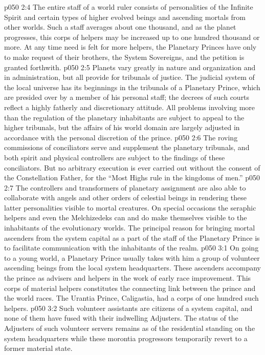 \vs p050 2:4 The entire staff of a world ruler consists of personalities of the Infinite Spirit and certain types of higher evolved beings and ascending mortals from other worlds. Such a staff averages about one thousand, and as the planet progresses, this corps of helpers may be increased up to one hundred thousand or more. At any time need is felt for more helpers, the Planetary Princes have only to make request of their brothers, the System Sovereigns, and the petition is granted forthwith.
\vs p050 2:5 Planets vary greatly in nature and organization and in administration, but all provide for tribunals of justice. The judicial system of the local universe has its beginnings in the tribunals of a Planetary Prince, which are presided over by a member of his personal staff; the decrees of such courts reflect a highly fatherly and discretionary attitude. All problems involving more than the regulation of the planetary inhabitants are subject to appeal to the higher tribunals, but the affairs of his world domain are largely adjusted in accordance with the personal discretion of the prince.
\vs p050 2:6 The roving commissions of conciliators serve and supplement the planetary tribunals, and both spirit and physical controllers are subject to the findings of these conciliators. But no arbitrary execution is ever carried out without the consent of the Constellation Father, for the “Most Highs rule in the kingdoms of men.”
\vs p050 2:7 The controllers and transformers of planetary assignment are also able to collaborate with angels and other orders of celestial beings in rendering these latter personalities visible to mortal creatures. On special occasions the seraphic helpers and even the Melchizedeks can and do make themselves visible to the inhabitants of the evolutionary worlds. The principal reason for bringing mortal ascenders from the system capital as a part of the staff of the Planetary Prince is to facilitate communication with the inhabitants of the realm.
\vs p050 3:1 On going to a young world, a Planetary Prince usually takes with him a group of volunteer ascending beings from the local system headquarters. These ascenders accompany the prince as advisers and helpers in the work of early race improvement. This corps of material helpers constitutes the connecting link between the prince and the world races. The Urantia Prince, Caligastia, had a corps of one hundred such helpers.
\vs p050 3:2 \pc Such volunteer assistants are citizens of a system capital, and none of them have fused with their indwelling Adjusters. The status of the Adjusters of such volunteer servers remains as of the residential standing on the system headquarters while these morontia progressors temporarily revert to a former material state.
